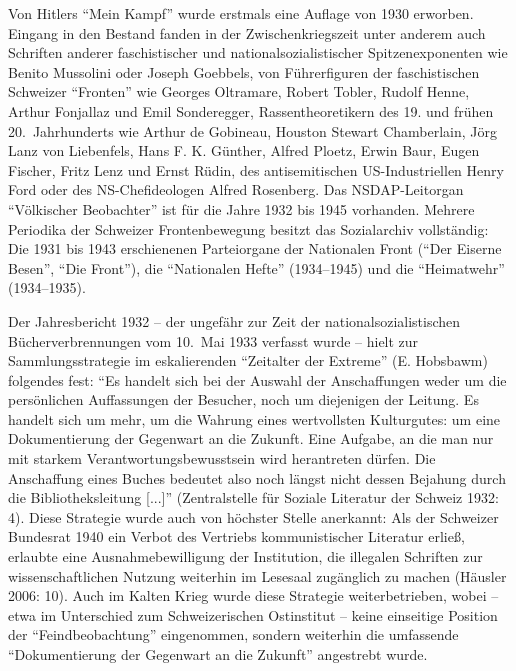 \documentclass[a4paper,
fontsize=11pt,
oneside,
numbers=noperiodatend,
parskip=half-,
bibliography=totoc,
final
]{scrartcl}
\begin{document}
Von Hitlers \enquote{Mein Kampf} wurde erstmals eine Auflage von 1930
erworben. Eingang in den Bestand fanden in der Zwischenkriegszeit unter
anderem auch Schriften anderer faschistischer und
nationalsozialistischer Spitzenexponenten wie Benito Mussolini oder
Joseph Goebbels, von Führerfiguren der faschistischen Schweizer
\enquote{Fronten} wie Georges Oltramare, Robert Tobler, Rudolf Henne,
Arthur Fonjallaz und Emil Sonderegger, Rassentheoretikern des 19. und
frühen 20.~Jahrhunderts wie Arthur de Gobineau, Houston Stewart
Chamberlain, Jörg Lanz von Liebenfels, Hans F. K. Günther, Alfred
Ploetz, Erwin Baur, Eugen Fischer, Fritz Lenz und Ernst Rüdin, des
antisemitischen US-Industriellen Henry Ford oder des NS-Chefideologen
Alfred Rosenberg. Das NSDAP-Leitorgan \enquote{Völkischer Beobachter}
ist für die Jahre 1932 bis 1945 vorhanden. Mehrere Periodika der
Schweizer Frontenbewegung besitzt das Sozialarchiv vollständig: Die 1931
bis 1943 erschienenen Parteiorgane der Nationalen Front (\enquote{Der
Eiserne Besen}, \enquote{Die Front}), die \enquote{Nationalen Hefte}
(1934--1945) und die \enquote{Heimatwehr} (1934--1935).

Der Jahresbericht 1932 -- der ungefähr zur Zeit der
nationalsozialistischen Bücherverbrennungen vom 10.~Mai 1933 verfasst
wurde -- hielt zur Sammlungsstrategie im eskalierenden
\enquote{Zeitalter der Extreme} (E. Hobsbawm) folgendes fest:
\enquote{Es handelt sich bei der Auswahl der Anschaffungen weder um die
persönlichen Auffassungen der Besucher, noch um diejenigen der Leitung.
Es handelt sich um mehr, um die Wahrung eines wertvollsten Kulturgutes:
um eine Dokumentierung der Gegenwart an die Zukunft. Eine Aufgabe, an
die man nur mit starkem Verantwortungsbewusstsein wird herantreten
dürfen. Die Anschaffung eines Buches bedeutet also noch längst nicht
dessen Bejahung durch die Bibliotheksleitung {[}...{]}} (Zentralstelle
für Soziale Literatur der Schweiz 1932: 4). Diese Strategie wurde auch
von höchster Stelle anerkannt: Als der Schweizer Bundesrat 1940 ein
Verbot des Vertriebs kommunistischer Literatur erließ, erlaubte eine
Ausnahmebewilligung der Institution, die illegalen Schriften zur
wissenschaftlichen Nutzung weiterhin im Lesesaal zugänglich zu machen
(Häusler 2006: 10). Auch im Kalten Krieg wurde diese Strategie
weiterbetrieben, wobei -- etwa im Unterschied zum Schweizerischen
Ostinstitut -- keine einseitige Position der \enquote{Feindbeobachtung}
eingenommen, sondern weiterhin die umfassende \enquote{Dokumentierung
der Gegenwart an die Zukunft} angestrebt wurde.
\end{document}
